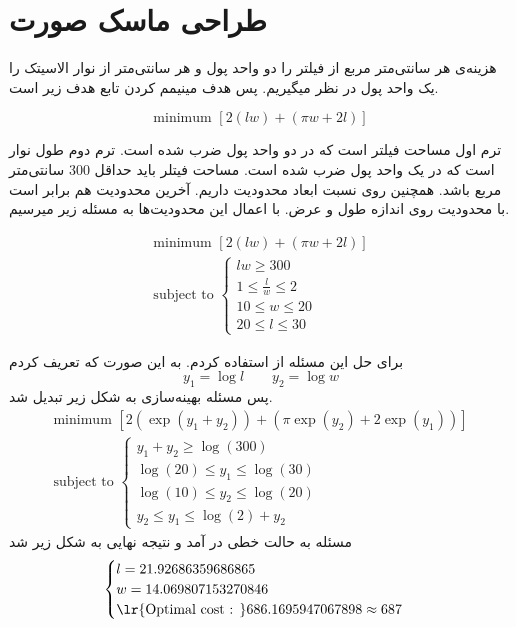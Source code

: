 
	
\section{
	طراحی ماسک صورت
}
هزینه‌ی هر سانتی‌متر مربع از فیلتر را دو واحد پول و هر سانتی‌متر از نوار الاسیتک را یک واحد پول در نظر میگیریم. پس هدف مینیمم کردن تابع هدف زیر است. 
\begin{latin}
	\begin{equation*}
		\text{minimum } [2(lw) + (\pi w + 2 l)]
	\end{equation*}
\end{latin}
ترم اول مساحت فیلتر است که در دو واحد پول ضرب شده است. ترم دوم طول نوار است که در یک واحد پول ضرب شده است. مساحت فیتلر باید حداقل 300 سانتی‌متر مربع باشد. همچنین روی نسبت ابعاد محدودیت داریم. آخرین محدودیت هم برابر است با محدودیت روی اندازه طول و عرض. با اعمال این محدودیت‌ها به مسئله زیر میرسیم.
\begin{latin}
	\begin{gather*}
		\text{minimum } [2(lw) + (\pi w + 2 l)]
		\\
		\text{subject to }
		\begin{cases}
			lw \geq 300
			\\
			1 \leq \frac{l}{w} \leq 2
			\\
			10 \leq w \leq 20
			\\
			20 \leq l \leq 30
		\end{cases}
	\end{gather*}
\end{latin}
برای حل این مسئله از 
استفاده کردم. به این صورت که تعریف کردم
\begin{equation*}
	y_{1} = \log l  \qquad y_{2} = \log w
\end{equation*}
پس مسئله بهینه‌سازی به شکل زیر تبدیل شد.
\begin{gather*}
	\text{minimum } [2(\exp(y_{1}+y_{2})) + (\pi \exp(y_{2}) + 2 \exp(y_{1}))]
	\\
	\text{subject to }
	\begin{cases}
		y_{1} + y_{2} \geq \log(300)  
		\\
		\log(20) \leq y_{1} \leq \log(30)
		\\
		\log(10) \leq y_{2} \leq \log(20)
		\\
		y_{2} \leq y_{1} \leq  \log(2) + y_{2}
	\end{cases}
\end{gather*}
مسئله به حالت خطی در آمد و نتیجه نهایی به شکل زیر شد
\begin{gather*}
	\begin{cases}
		l = 21.92686359686865
		\\
		w = 14.069807153270846
		\\
		\text{\lr{Optimal cost : }} 686.1695947067898 \approx 687
	\end{cases}
\end{gather*}